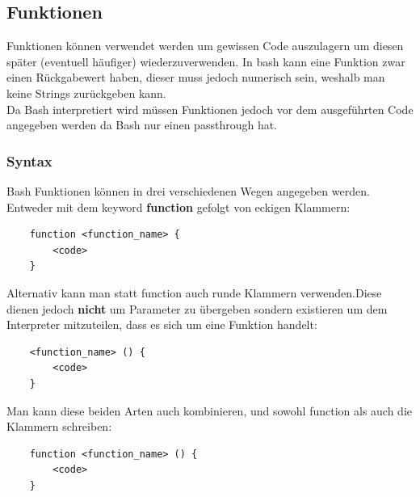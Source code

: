 \documentclass{article}
\begin{document}
	\subsection{Funktionen}
	Funktionen können verwendet werden um gewissen Code auszulagern um diesen später (eventuell häufiger) wiederzuverwenden. In bash kann eine Funktion zwar einen Rückgabewert haben, dieser muss jedoch numerisch sein, weshalb man keine Strings zurückgeben kann. \\
	Da Bash interpretiert wird müssen Funktionen jedoch vor dem ausgeführten Code angegeben werden da Bash nur einen passthrough hat. \\
	\subsubsection{Syntax}
	Bash Funktionen können in drei verschiedenen Wegen angegeben werden. \\
	Entweder mit dem keyword \textbf{function} gefolgt von eckigen Klammern:
	\begin{verbatim}
	function <function_name> {
		<code>
	}
	\end{verbatim}
	Alternativ kann man statt function auch runde Klammern verwenden.Diese dienen jedoch \textbf{nicht} um Parameter zu übergeben sondern existieren um dem Interpreter mitzuteilen, dass es sich um eine Funktion handelt:
	\begin{verbatim}
	<function_name> () {
		<code>
	}
	\end{verbatim}
	Man kann diese beiden Arten auch kombinieren, und sowohl function als auch die Klammern schreiben:
	\begin{verbatim}
	function <function_name> () {
		<code>
	}
	\end{verbatim}
	
\end{document}

